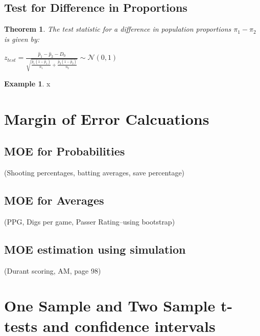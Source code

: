 \documentclass[
  11pt,
]{book}
\newtheorem{theorem}{Theorem}[chapter]
\theoremstyle{definition}
\theoremstyle{definition}
\newtheorem{example}{Example}[chapter]
\theoremstyle{definition}
\theoremstyle{definition}
\theoremstyle{remark}
\begin{document}
\newpage

\hypertarget{test-for-difference-in-proportions}{%
\subsection{Test for Difference in Proportions}\label{test-for-difference-in-proportions}}

\begin{theorem}
The test statistic for a difference in population proportions \(\pi_1 - \pi_2\) is given by:

\(z_{test} = \frac{\hat{p}_1 - \hat{p}_2 - D_0}{\sqrt{\frac{\hat{p}_1(1-\hat{p}_1)}{n_1}+\frac{\hat{p}_2(1-\hat{p}_2)}{n_2}}} \sim \mathcal{N}(0,1)\)
\end{theorem}

\begin{example}
x
\end{example}

\newpage

\hypertarget{margin-of-error-calcuations}{%
\section{Margin of Error Calcuations}\label{margin-of-error-calcuations}}

\hypertarget{moe-for-probabilities}{%
\subsection{MOE for Probabilities}\label{moe-for-probabilities}}

(Shooting percentages, batting averages, save percentage)

\hypertarget{moe-for-averages}{%
\subsection{MOE for Averages}\label{moe-for-averages}}

(PPG, Digs per game, Passer Rating--using bootstrap)

\hypertarget{moe-estimation-using-simulation}{%
\subsection{MOE estimation using simulation}\label{moe-estimation-using-simulation}}

(Durant scoring, AM, page 98)

\hypertarget{one-sample-and-two-sample-t-tests-and-confidence-intervals}{%
\section{One Sample and Two Sample t-tests and confidence intervals}\label{one-sample-and-two-sample-t-tests-and-confidence-intervals}}
\end{document}
